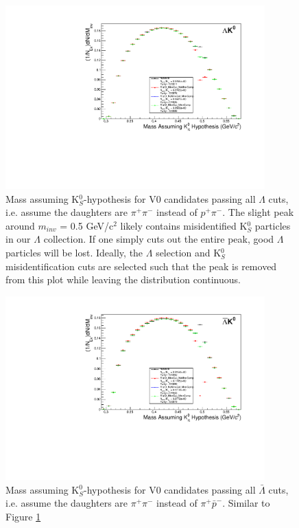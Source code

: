 \documentclass[../AnalysisNoteJBuxton.tex]{subfiles}
\begin{document}
\begin{figure}[h]
  \centering
  \includegraphics[width=100mm]{3_DataSelection/Figures/MassAssHypotheses/canMassAssK0HypCompare_LamK0_wNoMisID.pdf}
  \caption[K$^{0}_{S}$ contamination in $\Lambda$ collection]{Mass assuming K$^{0}_{S}$-hypothesis for V0 candidates passing all $\Lambda$ cuts, i.e. assume the daughters are $\pi^{+}\pi^{-}$ instead of $p^{+}\pi^{-}$.  The slight peak around $m_{inv}$ = 0.5 GeV/c$^{2}$ likely contains misidentified K$^{0}_{S}$ particles in our $\Lambda$ collection.  If one simply cuts out the entire peak, good $\Lambda$ particles will be lost.  Ideally, the $\Lambda$ selection and K$^{0}_{S}$ misidentification cuts are selected such that the peak is removed from this plot while leaving the distribution continuous.}
  \label{fig:MassAssK0ShortHyp_LamK0}
\end{figure}

\begin{figure}[h]
  \centering
  \includegraphics[width=100mm]{3_DataSelection/Figures/MassAssHypotheses/canMassAssK0HypCompare_ALamK0_wNoMisID.pdf}
  \caption[K$^{0}_{S}$ contamination in $\bar{\Lambda}$ collection]{Mass assuming K$^{0}_{S}$-hypothesis for V0 candidates passing all $\bar{\Lambda}$ cuts, i.e. assume the daughters are $\pi^{+}\pi^{-}$ instead of $\pi^{+}\bar{p}^{-}$.  Similar to Figure \ref{fig:MassAssK0ShortHyp_LamK0}}
  \label{fig:MassAssK0ShortHyp_ALamK0}
\end{figure}
\end{document}
